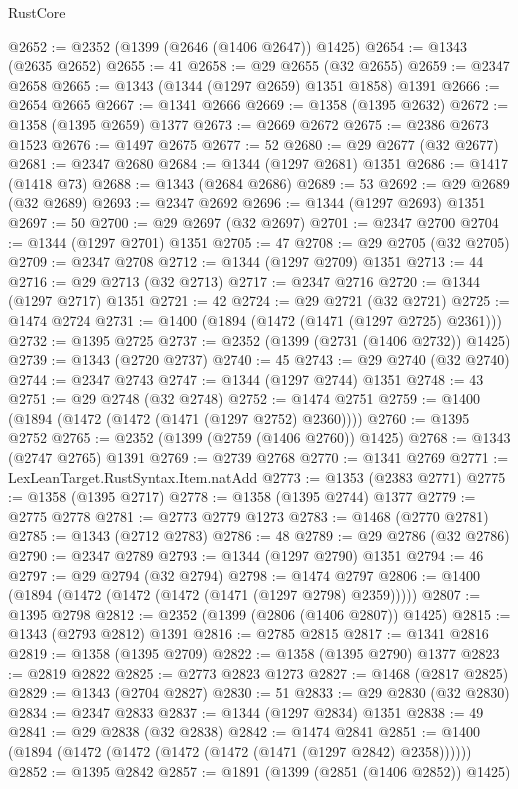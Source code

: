 \begin{lexlean}{RustCore}
\begin{coremodule}
{\begin{coremodule}
{{{{{{{{{{{{{{{{{{{{{{{{{{{{{{{{{{{{{{{{{{{{@2652 := @2352 (@1399 (@2646 (@1406 @2647)) @1425)
@2654 := @1343 (@2635 @2652)
@2655 := 41
@2658 := @29 @2655 (@32 @2655)
@2659 := @2347 @2658
@2665 := @1343 (@1344 (@1297 @2659) @1351 @1858) @1391
@2666 := @2654 @2665
@2667 := @1341 @2666
@2669 := @1358 (@1395 @2632)
@2672 := @1358 (@1395 @2659) @1377
@2673 := @2669 @2672
@2675 := @2386 @2673 @1523
@2676 := @1497 @2675
@2677 := 52
@2680 := @29 @2677 (@32 @2677)
@2681 := @2347 @2680
@2684 := @1344 (@1297 @2681) @1351
@2686 := @1417 (@1418 @73)
@2688 := @1343 (@2684 @2686)
@2689 := 53
@2692 := @29 @2689 (@32 @2689)
@2693 := @2347 @2692
@2696 := @1344 (@1297 @2693) @1351
@2697 := 50
@2700 := @29 @2697 (@32 @2697)
@2701 := @2347 @2700
@2704 := @1344 (@1297 @2701) @1351
@2705 := 47
@2708 := @29 @2705 (@32 @2705)
@2709 := @2347 @2708
@2712 := @1344 (@1297 @2709) @1351
@2713 := 44
@2716 := @29 @2713 (@32 @2713)
@2717 := @2347 @2716
@2720 := @1344 (@1297 @2717) @1351
@2721 := 42
@2724 := @29 @2721 (@32 @2721)
@2725 := @1474 @2724
@2731 := @1400 (@1894 (@1472 (@1471 (@1297 @2725) @2361)))
@2732 := @1395 @2725
@2737 := @2352 (@1399 (@2731 (@1406 @2732)) @1425)
@2739 := @1343 (@2720 @2737)
@2740 := 45
@2743 := @29 @2740 (@32 @2740)
@2744 := @2347 @2743
@2747 := @1344 (@1297 @2744) @1351
@2748 := 43
@2751 := @29 @2748 (@32 @2748)
@2752 := @1474 @2751
@2759 := @1400 (@1894 (@1472 (@1472 (@1471 (@1297 @2752) @2360))))
@2760 := @1395 @2752
@2765 := @2352 (@1399 (@2759 (@1406 @2760)) @1425)
@2768 := @1343 (@2747 @2765) @1391
@2769 := @2739 @2768
@2770 := @1341 @2769
@2771 := LexLeanTarget.RustSyntax.Item.natAdd
@2773 := @1353 (@2383 @2771)
@2775 := @1358 (@1395 @2717)
@2778 := @1358 (@1395 @2744) @1377
@2779 := @2775 @2778
@2781 := @2773 @2779 @1273
@2783 := @1468 (@2770 @2781)
@2785 := @1343 (@2712 @2783)
@2786 := 48
@2789 := @29 @2786 (@32 @2786)
@2790 := @2347 @2789
@2793 := @1344 (@1297 @2790) @1351
@2794 := 46
@2797 := @29 @2794 (@32 @2794)
@2798 := @1474 @2797
@2806 := @1400 (@1894 (@1472 (@1472 (@1472 (@1471 (@1297 @2798) @2359)))))
@2807 := @1395 @2798
@2812 := @2352 (@1399 (@2806 (@1406 @2807)) @1425)
@2815 := @1343 (@2793 @2812) @1391
@2816 := @2785 @2815
@2817 := @1341 @2816
@2819 := @1358 (@1395 @2709)
@2822 := @1358 (@1395 @2790) @1377
@2823 := @2819 @2822
@2825 := @2773 @2823 @1273
@2827 := @1468 (@2817 @2825)
@2829 := @1343 (@2704 @2827)
@2830 := 51
@2833 := @29 @2830 (@32 @2830)
@2834 := @2347 @2833
@2837 := @1344 (@1297 @2834) @1351
@2838 := 49
@2841 := @29 @2838 (@32 @2838)
@2842 := @1474 @2841
@2851 := @1400 (@1894 (@1472 (@1472 (@1472 (@1472 (@1471 (@1297 @2842) @2358))))))
@2852 := @1395 @2842
@2857 := @1891 (@1399 (@2851 (@1406 @2852)) @1425)
}}}}}}}}}}}}}}}}}}}}}}}}}}}}}}}}}}}}}}}}}}}}
\end{coremodule}}
\end{coremodule}
\end{lexlean}
